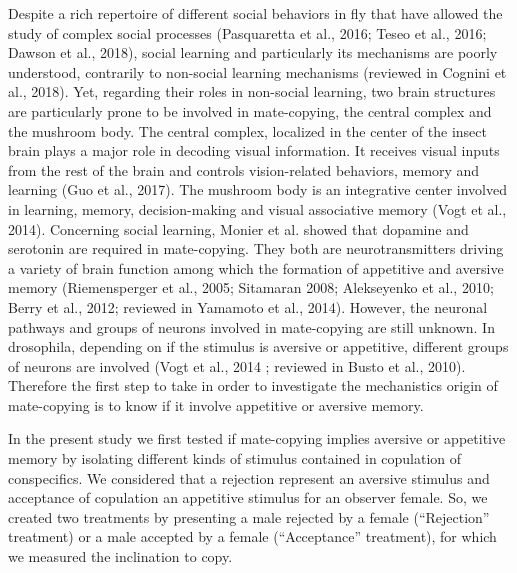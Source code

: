 \documentclass[a4paper, 12pt]{article}
\begin{document}
	Despite a rich repertoire of different social behaviors in fly that have allowed the study of complex social processes (Pasquaretta et al., 2016; Teseo et al., 2016; Dawson et al., 2018), social learning and particularly its mechanisms are poorly understood, contrarily to non-social learning mechanisms (reviewed in Cognini et al., 2018). Yet, regarding their roles in non-social learning, two brain structures are particularly prone to be involved in mate-copying, the central complex and the mushroom body. The central complex, localized in the center of the insect brain plays a major role in decoding visual information. It receives visual inputs from the rest of the brain and controls vision-related behaviors, memory and learning (Guo et al., 2017). The mushroom body is an integrative center involved in learning, memory, decision-making and visual associative memory (Vogt et al., 2014). Concerning social learning, Monier et al. showed that dopamine and serotonin are required in mate-copying. They both are neurotransmitters driving a variety of brain function among which the formation of appetitive and aversive memory (Riemensperger et al., 2005; Sitamaran 2008; Alekseyenko et al., 2010; Berry et al., 2012; reviewed in Yamamoto et al., 2014). However, the neuronal pathways and groups of neurons involved in mate-copying are still unknown. In drosophila, depending on if the stimulus is aversive or appetitive, different groups of neurons are involved (Vogt et al., 2014 ; reviewed in Busto et al., 2010). Therefore the first step to take in order to investigate the mechanistics origin of mate-copying is to know if it involve appetitive or aversive memory.
	
	In the present study we first tested if mate-copying implies aversive or appetitive memory by isolating different kinds of stimulus contained in copulation of conspecifics. We considered that a rejection represent an aversive stimulus and acceptance of copulation an appetitive stimulus for an observer female. So, we created two treatments by presenting a male rejected by a female (``Rejection'' treatment) or a male accepted by a female (``Acceptance'' treatment), for which we measured the inclination to copy.
	
\end{document}
